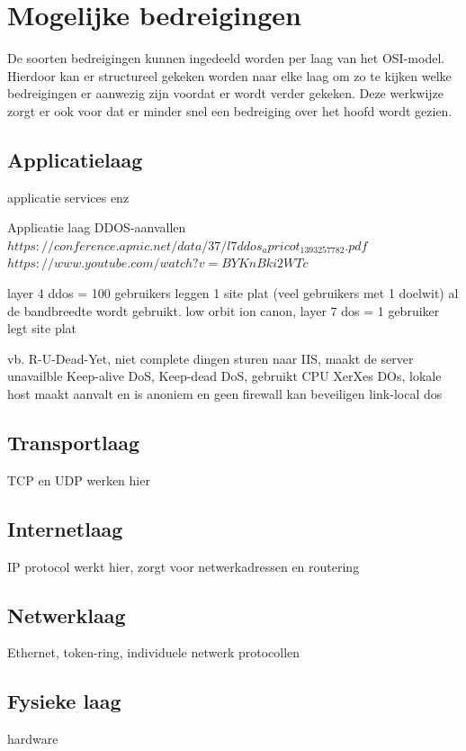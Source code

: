 \documentclass[pdftex,a4paper,12pt]{report}
\begin{document}
\section{Mogelijke bedreigingen}
De soorten bedreigingen kunnen ingedeeld worden per laag van het OSI-model. Hierdoor kan er structureel gekeken worden naar elke laag om zo te kijken welke bedreigingen er aanwezig zijn voordat er wordt verder gekeken. Deze werkwijze zorgt er ook voor dat er minder snel een bedreiging over het hoofd wordt gezien.

\subsection{Applicatielaag}
applicatie services enz

Applicatie laag DDOS-aanvallen $https://conference.apnic.net/data/37/l7ddos_apricot_1393257782.pdf$
$https://www.youtube.com/watch?v=BYKnBki2WTc$

layer 4 ddos = 100 gebruikers leggen 1 site plat (veel gebruikers met 1 doelwit) al de bandbreedte wordt gebruikt. low orbit ion canon, 
layer 7 dos = 1 gebruiker legt site plat

vb. R-U-Dead-Yet, niet complete dingen sturen naar IIS, maakt de server unavailble
Keep-alive DoS, 
Keep-dead DoS, gebruikt CPU
XerXes DOs, lokale host maakt aanvalt en is anoniem en geen firewall kan beveiligen
link-local dos

\subsection{Transportlaag}
TCP en UDP werken hier
\subsection{Internetlaag}
IP protocol werkt hier, zorgt voor netwerkadressen en routering
\subsection{Netwerklaag}
Ethernet, token-ring, individuele netwerk protocollen 
\subsection{Fysieke laag}
hardware
\end{document}
